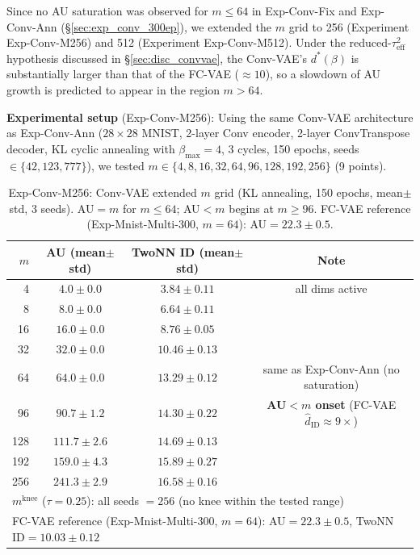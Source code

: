 \documentclass[make,article,submit,pdftex,moreauthors]{Definitions/mdpi}
\newcommand{\mknee}{m^{\mathrm{knee}}}
\begin{document}
Since no AU saturation was observed for $m \leq 64$ in Exp-Conv-Fix and Exp-Conv-Ann (\S\ref{sec:exp_conv_300ep}),
we extended the $m$ grid to 256 (Experiment Exp-Conv-M256) and 512 (Experiment Exp-Conv-M512).
Under the reduced-$\tau^2_\mathrm{eff}$ hypothesis discussed in \S\ref{sec:disc_convvae},
the Conv-VAE's $d^*(\beta)$ is substantially larger than that of the FC-VAE ($\approx 10$),
so a slowdown of AU growth is predicted to appear in the region $m>64$.

\textbf{Experimental setup} (Exp-Conv-M256):
Using the same Conv-VAE architecture as Exp-Conv-Ann ($28\times28$ MNIST, 2-layer Conv encoder,
2-layer ConvTranspose decoder, KL cyclic annealing with $\beta_\mathrm{max}=4$, 3 cycles,
150 epochs, seeds$\in\{42,123,777\}$),
we tested $m \in \{4, 8, 16, 32, 64, 96, 128, 192, 256\}$ (9 points).

\begin{table}[H]
\centering
\caption{Exp-Conv-M256: Conv-VAE extended $m$ grid (KL annealing, 150 epochs, mean$\pm$std, 3 seeds). AU$=m$ for $m \leq 64$; AU$<m$ begins at $m \geq 96$. FC-VAE reference (Exp-Mnist-Multi-300, $m=64$): AU$=22.3\pm0.5$.}
\label{tab:en}
\small
\begin{tabular}{rccc}
\toprule
$m$ & AU (mean$\pm$std) & TwoNN ID (mean$\pm$std) & Note \\
\midrule
  4 & $4.0\pm0.0$   & $3.84\pm0.11$ & all dims active \\
  8 & $8.0\pm0.0$   & $6.64\pm0.11$ & \\
 16 & $16.0\pm0.0$  & $8.76\pm0.05$ & \\
 32 & $32.0\pm0.0$  & $10.46\pm0.13$ & \\
 64 & $64.0\pm0.0$  & $13.29\pm0.12$ & same as Exp-Conv-Ann (no saturation) \\
 96 & $\mathbf{90.7\pm1.2}$  & $14.30\pm0.22$ & \textbf{AU$<m$ onset} (FC-VAE $\hat{d}_\mathrm{ID} \approx 9\times$) \\
128 & $111.7\pm2.6$ & $14.69\pm0.13$ & \\
192 & $159.0\pm4.3$ & $15.89\pm0.27$ & \\
256 & $241.3\pm2.9$ & $16.58\pm0.16$ & \\
\midrule
\multicolumn{4}{l}{$\mknee$ ($\tau=0.25$): all seeds $=256$ (no knee within the tested range)} \\
\multicolumn{4}{l}{FC-VAE reference (Exp-Mnist-Multi-300, $m=64$): AU$=22.3\pm0.5$, TwoNN ID$=10.03\pm0.12$} \\
\bottomrule
\end{tabular}
\end{table}
\end{document}
